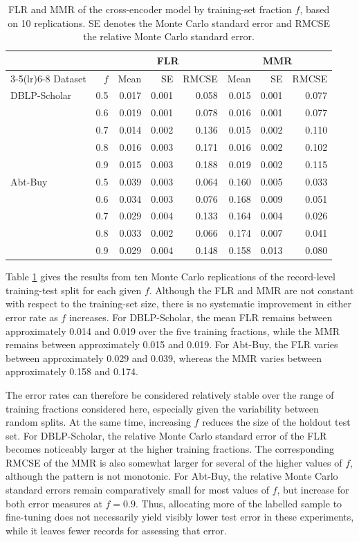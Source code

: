 \begin{table}[ht]
\centering
\caption{FLR and MMR of the cross-encoder model by training-set fraction $f$, based
on 10 replications. SE denotes the Monte Carlo standard error and RMCSE the relative
Monte Carlo standard error.}
\begin{tabular}{lrrrrrrr}
\toprule
& & \multicolumn{3}{c}{FLR} & \multicolumn{3}{c}{MMR} \\
\cmidrule(lr){3-5}\cmidrule(lr){6-8}
Dataset & $f$ & Mean & SE & RMCSE & Mean & SE & RMCSE \\
\midrule
DBLP-Scholar
& 0.5 & 0.017 & 0.001 & 0.058 & 0.015 & 0.001 & 0.077 \\
& 0.6 & 0.019 & 0.001 & 0.078 & 0.016 & 0.001 & 0.077 \\
& 0.7 & 0.014 & 0.002 & 0.136 & 0.015 & 0.002 & 0.110 \\
& 0.8 & 0.016 & 0.003 & 0.171 & 0.016 & 0.002 & 0.102 \\
& 0.9 & 0.015 & 0.003 & 0.188 & 0.019 & 0.002 & 0.115 \\
\addlinespace
Abt-Buy
& 0.5 & 0.039 & 0.003 & 0.064 & 0.160 & 0.005 & 0.033 \\
& 0.6 & 0.034 & 0.003 & 0.076 & 0.168 & 0.009 & 0.051 \\
& 0.7 & 0.029 & 0.004 & 0.133 & 0.164 & 0.004 & 0.026 \\
& 0.8 & 0.033 & 0.002 & 0.066 & 0.174 & 0.007 & 0.041 \\
& 0.9 & 0.029 & 0.004 & 0.148 & 0.158 & 0.013 & 0.080 \\
\bottomrule
\end{tabular}
\label{tab:training-fraction}
\end{table}

Table \ref{tab:training-fraction} gives the results from ten Monte Carlo
replications of the record-level training-test split for each given $f$. Although the FLR and MMR are not constant with respect
to the training-set size, there is no systematic improvement in either error rate as $f$
increases. For DBLP-Scholar, the mean FLR remains between approximately 0.014 and
0.019 over the five training fractions, while the MMR remains between approximately
0.015 and 0.019. For Abt-Buy, the FLR varies between approximately 0.029 and 0.039,
whereas the MMR varies between approximately 0.158 and 0.174.

The error rates can therefore be considered relatively stable over the range of training
fractions considered here, especially given the variability between random splits. At the
same time, increasing $f$ reduces the size of the holdout test set. For DBLP-Scholar,
the relative Monte Carlo standard error of the FLR becomes noticeably larger at the
higher training fractions. The corresponding RMCSE of the MMR is also somewhat
larger for several of the higher values of $f$, although the pattern is not monotonic.
For Abt-Buy, the relative Monte Carlo standard errors remain comparatively small for
most values of $f$, but increase for both error measures at $f=0.9$. Thus, allocating
more of the labelled sample to fine-tuning does not necessarily yield visibly lower test
error in these experiments, while it leaves fewer records for assessing that error.

